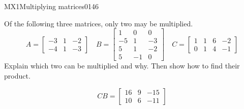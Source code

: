 \begin{exercise}{MX1}{Multiplying matrices}{0146} 
\begin{exerciseStatement} 

Of the following three matrices, only two may be multiplied. \[
          A=\left[\begin{array}{ccc}
-3 & 1 & -2 \\
-4 & 1 & -3
\end{array}\right] \hspace{1em} B=\left[\begin{array}{ccc}
1 & 0 & 0 \\
-5 & 1 & -3 \\
5 & 1 & -2 \\
5 & -1 & 0
\end{array}\right] \hspace{1em} C=\left[\begin{array}{cccc}
1 & 1 & 6 & -2 \\
0 & 1 & 4 & -1
\end{array}\right]
      \] Explain which two can be multiplied and why. Then show how to find their product.

 \end{exerciseStatement}
 \begin{exerciseAnswer} \[CB=\left[\begin{array}{ccc}
16 & 9 & -15 \\
10 & 6 & -11
\end{array}\right]\] \end{exerciseAnswer}
 \end{exercise}


\newpage




